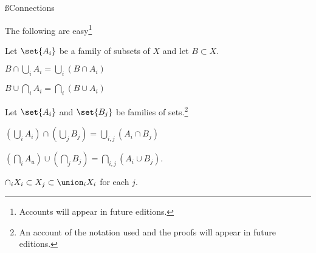 \ss{Connections}

The following are easy\footnote{Accounts will appear in future editions.}

Let $\set{A_i}$ be a family of subsets of $X$ and let $B \subset X$.

\begin{proposition}
  $B \cap \bigcup_{i} A_i = \bigcup_{i} (B \cap A_i)$
\end{proposition}

\begin{proposition}
  $B \cup \bigcap_{i} A_i = \bigcap_{i} (B \cup A_i)$
\end{proposition}

Let $\set{A_i}$ and $\set{B_j}$ be families of sets.\footnote{An account of the notation used and the proofs will appear in future editions.}

\begin{proposition}
    $(\bigcup_{i} A_i) \cap (\bigcup_{j} B_j) = \bigcup_{i,j}(A_i \cap B_j)$
\end{proposition}

\begin{proposition}
    $(\bigcap_{i} A_u) \cup (\bigcap_{j} B_j) = \bigcap_{i,j}(A_i \cup B_j).$
\end{proposition}

\begin{proposition}
  $\cap_i X_i \subset X_j \subset \union_i X_i$ for each $j$.
\end{proposition}





